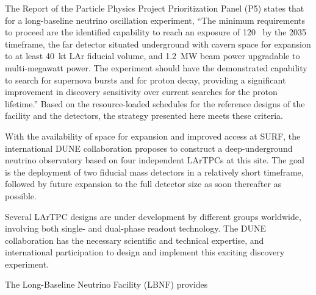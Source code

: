 The Report of the Particle Physics Project Prioritization Panel (P5) 
states that for a long-baseline neutrino oscillation experiment, ``The 
minimum requirements to proceed are the identified capability to reach an exposure 
of \num{120}~\ktMWyr{} by the 2035 timeframe, the far detector situated underground 
with cavern space for expansion to at least 40~kt LAr fiducial volume, and 1.2~MW 
beam power upgradable to multi-megawatt power. The experiment should have the demonstrated 
capability to search for supernova bursts and for proton decay, providing a significant 
improvement in discovery sensitivity over current searches for the proton lifetime.'' 
Based on the resource-loaded schedules for the reference designs of the facility %
and the detectors, %
the strategy presented here meets these criteria. 

With the availability of space for expansion and improved access at SURF, %
the international DUNE collaboration proposes to construct a deep-underground neutrino observatory based on four independent  LArTPCs at this site. %
The goal is the deployment of two  fiducial mass detectors in a relatively short timeframe, followed by future expansion to the full detector size as soon thereafter as possible. 

Several LArTPC designs are under development by different groups worldwide, involving both single- and dual-phase readout technology.
The DUNE %
collaboration has the necessary scientific and technical expertise, %
and international participation  to design and implement this exciting discovery experiment. 

The Long-Baseline Neutrino Facility (LBNF) provides

